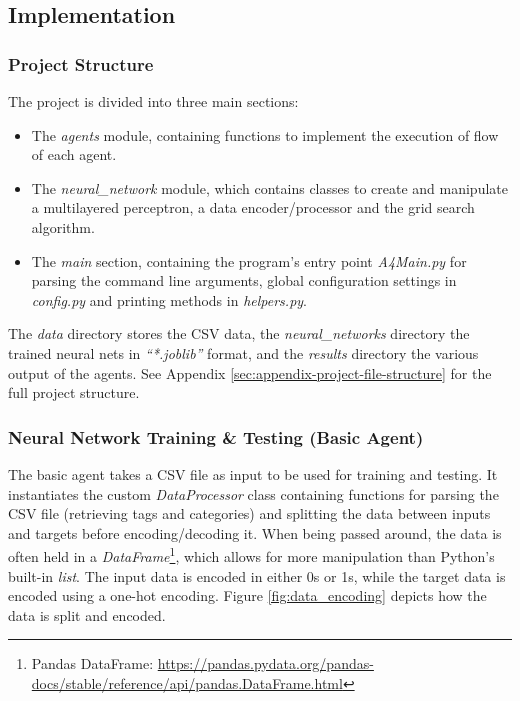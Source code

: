 \documentclass[letterpaper,12pt]{article}
\begin{document}

\subsection{Implementation}

\subsubsection{Project Structure}

The project is divided into three main sections:

\begin{itemize}
    \item The \textit{agents} module, containing functions to implement the execution of flow of each agent.
    \item The \textit{neural\_network} module, which contains classes to create and manipulate a multilayered perceptron, a data encoder/processor and the grid search algorithm.
    \item The \textit{main} section, containing the program's entry point \textit{A4Main.py} for parsing the command line arguments, global configuration settings in \textit{config.py} and printing methods in \textit{helpers.py}.
\end{itemize}

The \textit{data} directory stores the CSV data, the \textit{neural\_networks} directory the trained neural nets in \textit{``*.joblib''} format, and the \textit{results} directory the various output of the agents. See Appendix \ref{sec:appendix-project-file-structure} for the full project structure.


\subsubsection{Neural Network Training \& Testing (Basic Agent)}
\label{sec:basic-agent}

The basic agent takes a CSV file as input to be used for training and testing. It instantiates the custom \textit{DataProcessor} class containing functions for parsing the CSV file (retrieving tags and categories) and splitting the data between inputs and targets before encoding/decoding it. When being passed around, the data is often held in a \textit{DataFrame}\footnote{Pandas DataFrame: \url{https://pandas.pydata.org/pandas-docs/stable/reference/api/pandas.DataFrame.html}}, which allows for more manipulation than Python's built-in \textit{list}. The input data is encoded in either 0s or 1s, while the target data is encoded using a one-hot encoding. Figure \ref{fig:data_encoding} depicts how the data is split and encoded.
\end{document}
